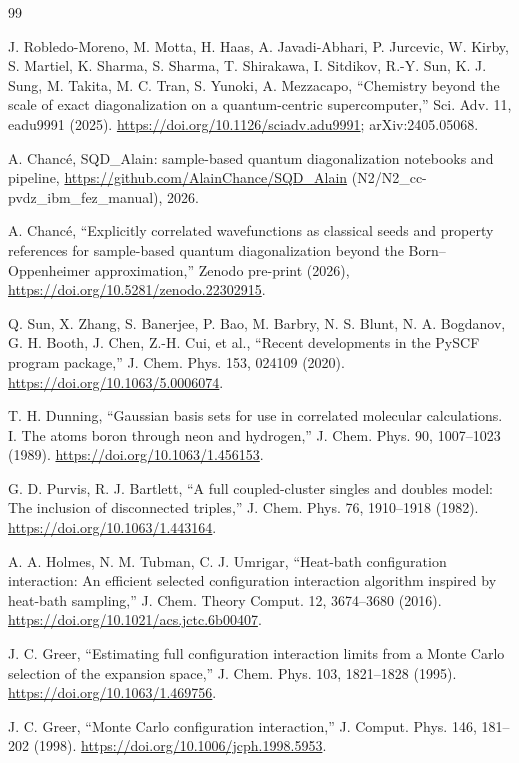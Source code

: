 \documentclass[11pt]{article}
\begin{document}
\begingroup\small\raggedright
\begin{thebibliography}{99}

J. Robledo-Moreno, M. Motta, H. Haas, A. Javadi-Abhari, P. Jurcevic, W. Kirby, S. Martiel, K. Sharma, S. Sharma, T. Shirakawa, I. Sitdikov, R.-Y. Sun, K. J. Sung, M. Takita, M. C. Tran, S. Yunoki, A. Mezzacapo, ``Chemistry beyond the scale of exact diagonalization on a quantum-centric supercomputer,'' Sci. Adv. 11, eadu9991 (2025). \url{https://doi.org/10.1126/sciadv.adu9991}; arXiv:2405.05068.

A. Chanc\'e, SQD\_Alain: sample-based quantum diagonalization notebooks and pipeline, \url{https://github.com/AlainChance/SQD_Alain} (N2/N2\_cc-pvdz\_ibm\_fez\_manual), 2026.

A. Chanc\'e, ``Explicitly correlated wavefunctions as classical seeds and property references for sample-based quantum diagonalization beyond the Born--Oppenheimer approximation,'' Zenodo pre-print (2026), \url{https://doi.org/10.5281/zenodo.22302915}.

Q. Sun, X. Zhang, S. Banerjee, P. Bao, M. Barbry, N. S. Blunt, N. A. Bogdanov, G. H. Booth, J. Chen, Z.-H. Cui, et al., ``Recent developments in the PySCF program package,'' J. Chem. Phys. 153, 024109 (2020). \url{https://doi.org/10.1063/5.0006074}.

T. H. Dunning, ``Gaussian basis sets for use in correlated molecular calculations. I. The atoms boron through neon and hydrogen,'' J. Chem. Phys. 90, 1007--1023 (1989). \url{https://doi.org/10.1063/1.456153}.

G. D. Purvis, R. J. Bartlett, ``A full coupled-cluster singles and doubles model: The inclusion of disconnected triples,'' J. Chem. Phys. 76, 1910--1918 (1982). \url{https://doi.org/10.1063/1.443164}.

A. A. Holmes, N. M. Tubman, C. J. Umrigar, ``Heat-bath configuration interaction: An efficient selected configuration interaction algorithm inspired by heat-bath sampling,'' J. Chem. Theory Comput. 12, 3674--3680 (2016). \url{https://doi.org/10.1021/acs.jctc.6b00407}.

J. C. Greer, ``Estimating full configuration interaction limits from a Monte Carlo selection of the expansion space,'' J. Chem. Phys. 103, 1821--1828 (1995). \url{https://doi.org/10.1063/1.469756}.

J. C. Greer, ``Monte Carlo configuration interaction,'' J. Comput. Phys. 146, 181--202 (1998). \url{https://doi.org/10.1006/jcph.1998.5953}.


\end{thebibliography}
\end{document}

